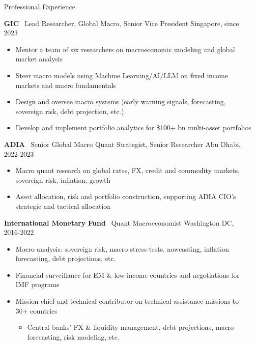 \documentclass[usegeometry, 10pt, a4paper]{cv} %
\newcommand{\activite}[1]{\textbf{#1}\ }
\begin{document}
\begin{rubriquetableau}[0.95\textwidth]{Professional Experience}\\
\vspace{-0.5cm}

\activite{GIC} Lead Researcher, Global Macro, Senior Vice President \hfill
Singapore, since 2023 \\ \vspace{-0.4cm}
\begin{itemize}
  \item Mentor a team of six researchers on macroeconomic modeling and global market analysis 
  \item Steer macro models using Machine Learning/AI/LLM on fixed income markets and macro fundamentals
  \item Design and oversee macro systems (early warning signals, forecasting, sovereign risk, debt projection, etc.) 
  \item Develop and implement portfolio analytics for \$100+ bn multi-asset portfolios

\end{itemize} 

\vspace{0.4cm}

\activite{ADIA} Senior Global Macro Quant Strategist, Senior Researcher  \hfill
Abu Dhabi, 2022-2023 \\ \vspace{-0.2cm}
\begin{itemize}[]
\item Macro quant research on global rates, FX, credit and commodity markets, sovereign risk, inflation, growth
\item Asset allocation, risk and portfolio construction, supporting ADIA CIO's strategic and tactical allocation
 \end{itemize}
 
\vspace{0.4cm}

\activite{International Monetary Fund} Quant Macroeconomist \hfill Washington DC, 2016-2022 \\
\vspace{-0.2cm}

\begin{itemize}[]
  \item Macro analysis: sovereign risk, macro stress-tests, nowcasting, inflation forecasting, debt projections, etc.
  \item Financial surveillance for EM \& low-income countries and negotiations for IMF programs 
  \item Mission chief and technical contributor on technical assistance missions to 30+ countries
  \begin{itemize} 
    \item Central banks' FX \& liquidity management, debt projections, macro forecasting, risk modeling, etc.
  \end{itemize}  
  \end{itemize}  
\vspace{0.4cm}


\end{rubriquetableau}
\end{document}
